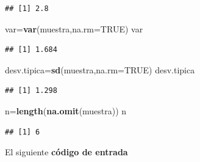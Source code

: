 \documentclass[]{article}
\newenvironment{Shaded}{\begin{snugshade}}{\end{snugshade}}
\newcommand{\KeywordTok}[1]{\textcolor[rgb]{0.13,0.29,0.53}{\textbf{{#1}}}}
\newcommand{\DataTypeTok}[1]{\textcolor[rgb]{0.13,0.29,0.53}{{#1}}}
\newcommand{\DecValTok}[1]{\textcolor[rgb]{0.00,0.00,0.81}{{#1}}}
\newcommand{\StringTok}[1]{\textcolor[rgb]{0.31,0.60,0.02}{{#1}}}
\newcommand{\OtherTok}[1]{\textcolor[rgb]{0.56,0.35,0.01}{{#1}}}
\newcommand{\ErrorTok}[1]{\textbf{{#1}}}
\newcommand{\NormalTok}[1]{{#1}}
\begin{document}
\begin{verbatim}
## [1] 2.8
\end{verbatim}

\begin{Shaded}
\begin{Highlighting}[]
\NormalTok{var=}\KeywordTok{var}\NormalTok{(muestra,}\DataTypeTok{na.rm=}\OtherTok{TRUE}\NormalTok{)}
\NormalTok{var}
\end{Highlighting}
\end{Shaded}

\begin{verbatim}
## [1] 1.684
\end{verbatim}

\begin{Shaded}
\begin{Highlighting}[]
\NormalTok{desv.tipica=}\KeywordTok{sd}\NormalTok{(muestra,}\DataTypeTok{na.rm=}\OtherTok{TRUE}\NormalTok{)}
\NormalTok{desv.tipica}
\end{Highlighting}
\end{Shaded}

\begin{verbatim}
## [1] 1.298
\end{verbatim}

\begin{Shaded}
\begin{Highlighting}[]
\NormalTok{n=}\KeywordTok{length}\NormalTok{(}\KeywordTok{na.omit}\NormalTok{(muestra))}
\NormalTok{n}
\end{Highlighting}
\end{Shaded}

\begin{verbatim}
## [1] 6
\end{verbatim}

El siguiente \textbf{código de entrada}

\begin{Shaded}
\end{Shaded}
\end{document}
